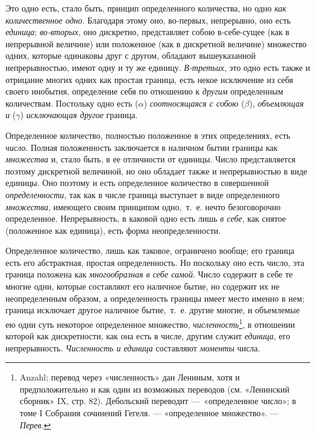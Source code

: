 Это одно есть, стало быть, принцип определенного количества, но одно
{\em как количественное одно}. Благодаря этому оно,
во-первых, непрерывно, оно есть {\em единица};
{\em во-вторых}, оно дискретно, представляет собою
в-себе-сущее (как в непрерывной величине) или положенное (как в дискретной
величине) множество одних, которые одинаковы друг с другом, обладают
вышеуказанной непрерывностью, имеют одну и ту же единицу.
{\em В-третьих}, это одно есть также и отрицание многих
одних как простая граница, есть некое исключение из себя своего инобытия,
определение себя по отношению к {\em другим}
определенным количествам. Постольку одно есть ($\alpha $)
{\em соотносящаяся с собою} ($\beta $),
{\em объемлющая и} ($\gamma $)
{\em исключающая другое} граница.

Определенное количество, полностью положенное в этих определениях, есть
{\em число}. Полная положенность заключается в наличном
бытии границы как {\em множества} и, стало быть, в ее
отличности от единицы. Число представляется поэтому дискретной величиной,
но оно обладает также и непрерывностью в виде единицы. Оно поэтому и есть
определенное количество в совершенной
{\em определенности}, так как в числе граница выступает
в виде определенного {\em множества}, имеющего своим
принципом одно,~т.~е. нечто безоговорочно определенное. Непрерывность, в
каковой одно есть лишь {\em в себе}, как снятое
(положенное как единица), есть форма неопределенности.

Определенное количество, лишь как таковое, ограничено вообще; его граница
есть его абстрактная, простая определенность. Но поскольку оно есть число,
эта граница положена как {\em многообразная в себе
самой}. Число содержит в себе те многие одни, которые составляют его
наличное бытие, но содержит их не неопределенным образом, а определенность
границы имеет место именно в нем; граница исключает другое наличное
бытие,~т.~е. другие многие, и объемлемые ею одни суть некоторое
определенное множество,
{\em численность}\footnote{Anzahl; перевод через «численность» дан Лениным, хотя и
предположительно и как один из возможных переводов (см. «Ленинский сборник»
IX, стр. 82). Дебольский переводит —~«определенное число»; в
томе I Собрания сочинений Гегеля. — «определенное
множество». — {\em Перев}.}, в отношении которой как
дискретности, как она есть в числе, другим служит
{\em единица}, его непрерывность.
{\em Численность и единица} составляют
{\em моменты} числа.

